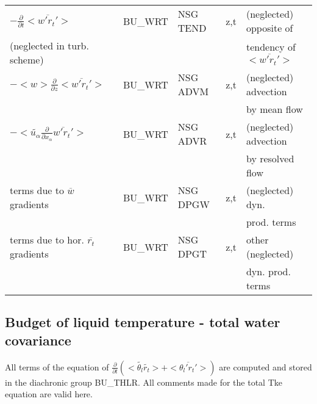 \begin{center}
\begin{tabular}{||p{5cm}|>{\centering}p{2cm}|>{\centering}p{2.5cm}|>{\centering}p{0.5cm}|p{5.5cm }||}
\hline
$-\frac{\partial }{\partial t}<\overline{w'r_t'}>$ & BU\_WRT & NSG TEND & z,t & (neglected) opposite of\\
(neglected in turb. scheme) & & & &tendency of $<\overline{w'r_t'}>$ \\
\hline
$-<w>\frac{\partial}{\partial z}<\overline{w'r_t'}>$  & BU\_WRT & NSG ADVM & z,t & (neglected) advection \\
 & & & & by mean flow\\
\hline
$-<\tilde{u_\alpha}\frac{\partial}{\partial x_\alpha}\overline{w'r_t'}>$  & BU\_WRT & NSG ADVR & z,t & (neglected) advection \\
 & & & & by resolved flow\\
\hline
terms due to $\overline{w}$ gradients  & BU\_WRT & NSG DPGW & z,t & (neglected) dyn. \\
 & & & & prod. terms \\
\hline
terms due to hor. $\overline{r_t}$ gradients  & BU\_WRT & NSG DPGT & z,t & other (neglected) \\
 & & & & dyn. prod. terms\\
\hline
\hline
\end{tabular}
\end{center}

\newpage

\subsection{Budget of liquid temperature - total water covariance}


All terms of the equation of $\frac{\partial}{\partial t} (<\tilde{\theta_l}\tilde{r_t}> + <\overline{\theta_l'r_t'}>)$ are
computed and stored in the diachronic group BU\_THLR. 
All comments made for the total Tke equation are valid here.\\

